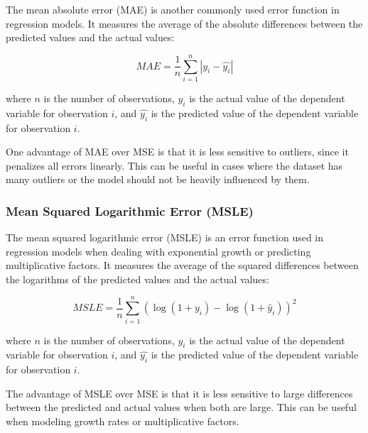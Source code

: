 \documentclass{beamer}
\begin{document}
The mean absolute error (MAE) is another commonly used error function in regression models. It measures the average of the absolute differences between the predicted values and the actual values:

\begin{equation}
MAE = \frac{1}{n}\sum_{i=1}^{n}|y_i - \hat{y_i}|
\end{equation}

where $n$ is the number of observations, $y_i$ is the actual value of the dependent variable for observation $i$, and $\hat{y_i}$ is the predicted value of the dependent variable for observation $i$.

One advantage of MAE over MSE is that it is less sensitive to outliers, since it penalizes all errors linearly. This can be useful in cases where the dataset has many outliers or the model should not be heavily influenced by them.

\subsubsection{Mean Squared Logarithmic Error (MSLE)}

\begin{center}
\end{center}

The mean squared logarithmic error (MSLE) is an error function used in regression models when dealing with exponential growth or predicting multiplicative factors. It measures the average of the squared differences between the logarithms of the predicted values and the actual values:

\begin{equation}
MSLE = \frac{1}{n}\sum_{i=1}^{n}(\log(1 + y_i) - \log(1 + \hat{y}_i))^2
\end{equation}

where $n$ is the number of observations, $y_i$ is the actual value of the dependent variable for observation $i$, and $\hat{y_i}$ is the predicted value of the dependent variable for observation $i$.

The advantage of MSLE over MSE is that it is less sensitive to large differences between the predicted and actual values when both are large. This can be useful when modeling growth rates or multiplicative factors.
\end{document}
